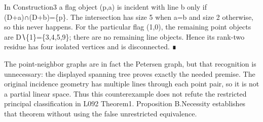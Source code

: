 In Construction3 a flag object (p,a) is incident with line b only if
(D+a)∩(D+b)=\{p\}. The intersection has size 5 when a=b and size 2
otherwise, so this never happens. For the particular flag (1,0), the
remaining point objects are D∖\{1\}=\{3,4,5,9\}; there are no remaining
line objects. Hence its rank-two residue has four isolated vertices and
is disconnected. ∎

The point-neighbor graphs are in fact the Petersen graph, but that
recognition is unnecessary: the displayed spanning tree proves exactly
the needed premise. The original incidence geometry has multiple lines
through each point pair, so it is not a partial linear space. Thus this
counterexample does not refute the restricted principal classification
in L092 Theorem1. Proposition B.Necessity establishes that theorem
without using the false unrestricted equivalence.
